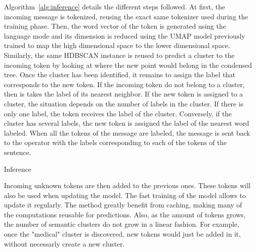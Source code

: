 Algorithm~\ref{alg:inference} details the different steps followed.
At first, the incoming message is tokenized, reusing the exact same tokenizer used during the training phase.
Then, the word vector of the token is generated using the language mode and its dimension is
reduced using the UMAP model previously trained to map the high dimensional space to the
lower dimensional space.
Similarly, the same HDBSCAN instance is reused to predict a cluster to the incoming token
by looking at where the new point would belong in the condensed tree.
Once the cluster has been identified, it remains to assign the label that corresponds to the new token.
If the incoming token do not belong to a cluster, then is takes the label of its nearest neighbor.
If the new token is assigned to a cluster, the situation depends on the number of labels
in the cluster.
If there is only one label, the token receives the label of the cluster.
Conversely, if the cluster has several labels, the new token is assigned the label of the
nearest word labeled.
When all the tokens of the message are labeled, the message is sent back to the operator with the labels corresponding to each of the tokens of the sentence.

\begin{algorithm}[htb]
    \DontPrintSemicolon
    \caption{Inference\label{alg:inference}}
\end{algorithm}

Incoming unknown tokens are then added to the previous ones.
These tokens will also be used when updating the model.
The fast training of the model allows to update it regularly.
The method greatly benefit from caching, making many of the computations reusable for predictions.
Also, as the amount of tokens grows, the number of semantic clusters do not grow in a linear fashion.
For example, once the "medical" cluster is discovered, new tokens would just be added in it, without necessarly create a new cluster.

